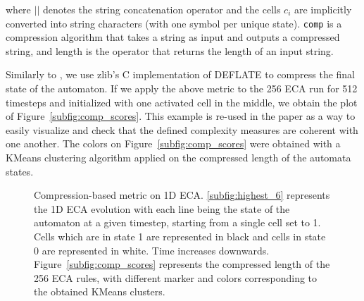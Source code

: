 where $||$ denotes the string concatenation operator and the cells $c_i$ are
implicitly converted into string characters (with one symbol per unique state).
\texttt{comp} is a compression algorithm that takes a string as input and
outputs a compressed string, and length is the operator that returns the length
of an input string.

Similarly to \parencite{kowaliwMeasuresComplexityArtificial2008,
  zenilCompressionBasedInvestigationDynamical2010}, we use zlib’s C
implementation of DEFLATE to compress the final state of the automaton. If we
apply the above metric to the 256 ECA run for 512 timesteps and initialized with
one activated cell in the middle, we obtain the plot of
Figure~\ref{subfig:comp_scores}. This example is re-used in the paper as a way
to easily visualize and check that the defined complexity measures are coherent
with one another. The colors on Figure~\ref{subfig:comp_scores} were obtained
with a KMeans clustering algorithm applied on the compressed length of the
automata states.

\begin{figure}[tbp]
  \centering {}
  \hfil
  \caption{Compression-based metric on 1D ECA. \ref{subfig:highest_6} represents
    the 1D ECA evolution with each line being the state of the automaton at a
    given timestep, starting from a single cell set to 1. Cells which are in
    state 1 are represented in black and cells in state 0 are represented in
    white. Time increases downwards. Figure~\ref{subfig:comp_scores} represents
    the compressed length of the 256 ECA rules, with different marker and colors
    corresponding to the obtained KMeans clusters.}
  \label{fig:comp_eca}
\end{figure}


